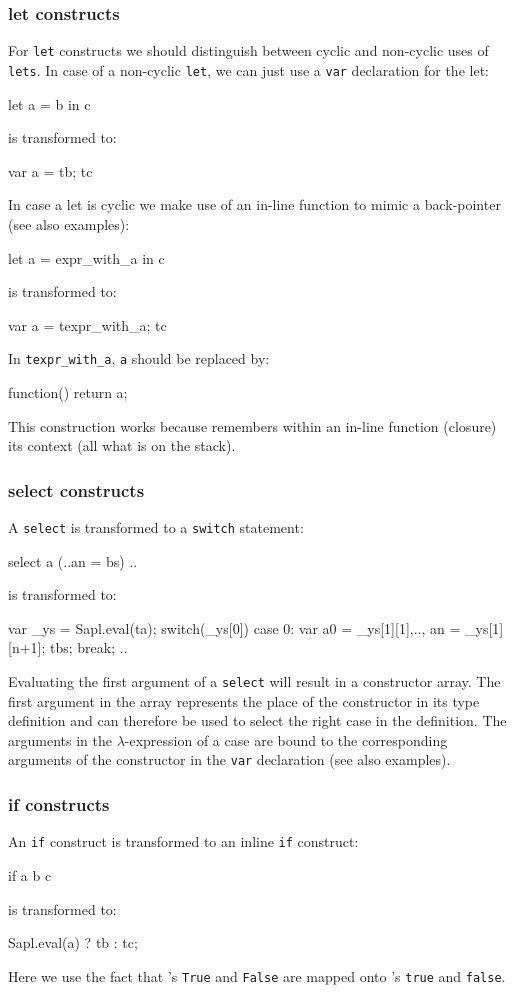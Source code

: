 \subsubsection{\textsf{let} constructs} 
For \texttt{let} constructs we should distinguish between cyclic and non-cyclic uses of \texttt{lets}.
In case of a non-cyclic \texttt{let}, we can just use a \texttt{var} declaration for the let:
\begin{CleanCode}
let a = b in c
\end{CleanCode}
is transformed to:
\begin{CleanCode}
var a = tb; tc
\end{CleanCode}
In case a let is cyclic we make use of an in-line \JS function to mimic a back-pointer (see also examples):
\begin{CleanCode}
let a = expr_with_a in c
\end{CleanCode}
is transformed to:
\begin{CleanCode}
var a = texpr_with_a; tc
\end{CleanCode}
In \texttt{texpr\_with\_a}, \texttt{a} should be replaced by: 
\begin{CleanCode}
function() {return a;}
\end{CleanCode}
This construction works because \JS remembers within an in-line function (closure) its context (all what is on the stack).

\subsubsection{\textsf{select} constructs} 
A \texttt{select} is transformed to a \texttt{switch} statement:
\begin{CleanCode}
select a (..an = bs) ..
\end{CleanCode}
is transformed to:
\begin{CleanCode}
var _ys = Sapl.eval(ta);
switch(_ys[0]) {
	case 0: var a0 = _ys[1][1],..,  an = _ys[1][n+1];
	        tbs;
            break;
	..
}
\end{CleanCode}
Evaluating the first argument of a \texttt{select} will result in a constructor array. 
The first argument in the array represents the place of the constructor in its type definition
and can therefore be used to select the right case in the definition.
The arguments in the $\lambda$-expression of a case are bound to the corresponding
arguments of the constructor in the \texttt{var} declaration (see also examples).

\subsubsection{\textsf{if} constructs} 
An \texttt{if} construct is transformed to an inline \JS \texttt{if} construct:
\begin{CleanCode}
if a b c
\end{CleanCode}
is transformed to:
\begin{CleanCode}
Sapl.eval(a) ? tb : tc;
\end{CleanCode}
Here we use the fact that \Sapl's \texttt{True} and \texttt{False} are mapped onto \JS's \texttt{true} and \texttt{false}.

